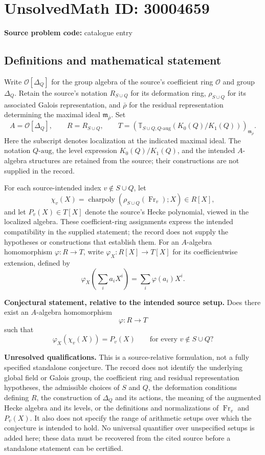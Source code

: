 \documentclass[11pt]{article}
\begin{document}
\section*{UnsolvedMath ID: 30004659}
\textbf{Source problem code:} catalogue entry
\subsection{Definitions and mathematical statement}
Write \(\mathcal O[\Delta_Q]\) for the group algebra of the source's coefficient ring \(\mathcal O\) and group \(\Delta_Q\). Retain the source's notation \(R_{S\cup Q}\) for its deformation ring, \(\rho_{S\cup Q}\) for its associated Galois representation, and \(\bar\rho\) for the residual representation determining the maximal ideal \(\mathfrak m_{\bar\rho}\). Set
\[
A=\mathcal O[\Delta_Q],\qquad
R=R_{S\cup Q},\qquad
T=\left(\mathbb T_{S\cup Q,Q\text{-aug}}(K_0(Q)/K_1(Q))\right)_{\mathfrak m_{\bar\rho}}.
\]
Here the subscript denotes localization at the indicated maximal ideal. The notation \(Q\text{-aug}\), the level expression \(K_0(Q)/K_1(Q)\), and the intended \(A\)-algebra structures are retained from the source; their constructions are not supplied in the record.

For each source-intended index \(v\notin S\cup Q\), let
\[
\chi_v(X)=\operatorname{charpoly}\!\left(\rho_{S\cup Q}(\operatorname{Fr}_v);X\right)\in R[X],
\]
and let \(P_v(X)\in T[X]\) denote the source's Hecke polynomial, viewed in the localized algebra. These coefficient-ring assignments express the intended compatibility in the supplied statement; the record does not supply the hypotheses or constructions that establish them. For an \(A\)-algebra homomorphism \(\varphi:R\to T\), write \(\varphi_X:R[X]\to T[X]\) for its coefficientwise extension, defined by
\[
\varphi_X\!\left(\sum_i a_iX^i\right)=\sum_i\varphi(a_i)X^i.
\]

\textbf{Conjectural statement, relative to the intended source setup.} Does there exist an \(A\)-algebra homomorphism
\[
\varphi:R\longrightarrow T
\]
such that
\[
\varphi_X(\chi_v(X))=P_v(X)
\qquad\text{for every }v\notin S\cup Q?
\]

\textbf{Unresolved qualifications.} This is a source-relative formulation, not a fully specified standalone conjecture. The record does not identify the underlying global field or Galois group, the coefficient ring and residual representation hypotheses, the admissible choices of \(S\) and \(Q\), the deformation conditions defining \(R\), the construction of \(\Delta_Q\) and its actions, the meaning of the augmented Hecke algebra and its levels, or the definitions and normalizations of \(\operatorname{Fr}_v\) and \(P_v(X)\). It also does not specify the range of arithmetic setups over which the conjecture is intended to hold. No universal quantifier over unspecified setups is added here; these data must be recovered from the cited source before a standalone statement can be certified.
\end{document}
